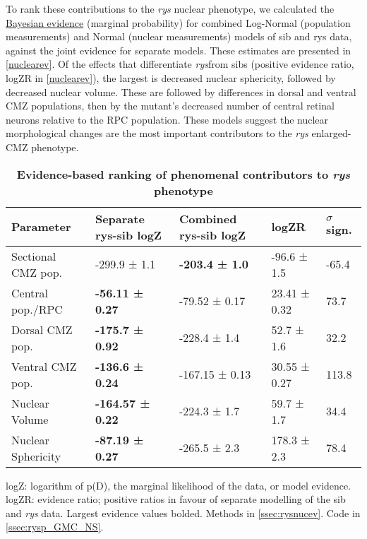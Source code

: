 To rank these contributions to the \textit{rys} nuclear phenotype, we calculated the \hyperref[ssec:BayesEpistemology]{Bayesian evidence} (marginal probability) for combined Log-Normal (population measurements) and Normal (nuclear measurements) models of sib and rys data, against the joint evidence for separate models. These estimates are presented in \autoref{nuclearev}. Of the effects that differentiate \textit{rys}from sibs (positive evidence ratio, logZR in \autoref{nuclearev}), the largest is decreased nuclear sphericity, followed by decreased nuclear volume. These are followed by differences in dorsal and ventral CMZ populations, then by the mutant's decreased number of central retinal neurons relative to the RPC population. These models suggest the nuclear morphological changes are the most important contributors to the \textit{rys} enlarged-CMZ phenotype.

\begin{table}[!ht]
    \centering
    \caption{{\bf Evidence-based ranking of phenomenal contributors to \textit{rys} phenotype}}
    \begin{tabular}{|l|l|l|l|l|} 
        \hline {\bf Parameter} & {\bf Separate rys-sib logZ} & {\bf Combined rys-sib logZ} & {\bf logZR} & {\bf $\sigma$ sign.}\\ \hline 
        Sectional CMZ pop. & -299.9 ± 1.1 & {\bf -203.4 ± 1.0} & -96.6 ± 1.5 & -65.4 \\ \hline
        Central pop./RPC  & {\bf -56.11 ± 0.27} & -79.52 ± 0.17 & 23.41 ± 0.32 & 73.7 \\ \hline 
        Dorsal CMZ pop. & {\bf -175.7 ± 0.92} & -228.4 ± 1.4 & 52.7 ± 1.6 & 32.2 \\ \hline 
        Ventral CMZ pop. & {\bf -136.6 ± 0.24} & -167.15 ± 0.13 & 30.55 ± 0.27 & 113.8 \\ \hline 
        Nuclear Volume & {\bf -164.57 ± 0.22} & -224.3 ± 1.7 & 59.7 ± 1.7 & 34.4 \\ \hline 
        Nuclear Sphericity & {\bf -87.19 ± 0.27} & -265.5 ± 2.3 & 178.3 ± 2.3 & 78.4 \\ \hline
    \end{tabular}
    \begin{flushleft}
    logZ: logarithm of p(D), the marginal likelihood of the data, or model evidence. logZR: evidence ratio; positive ratios in favour of separate modelling of the sib and \textit{rys} 
    data. Largest evidence values bolded.
    Methods in \autoref{ssec:rysnucev}.
    Code in \autoref{ssec:rysp_GMC_NS}.
    \end{flushleft}
    \label{nuclearev}
\end{table}

